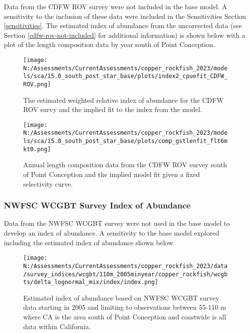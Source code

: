 \documentclass[11pt,
  english,
  letterpaper,
]{article}
\begin{document}
Data from the CDFW ROV survey were not included in the base model. A sensitivity to the inclusion of these data were included in the Sensitivities Section \ref{sensitivities}. The estimated index of abundance from the uncorrected data (see Section \ref{cdfw-rov-not-included} for additional information) is shown below with a plot of the length composition data by year south of Point Conception.

\begin{figure}
\centering
\texttt{[image: N:/Assessments/CurrentAssessments/copper\_rockfish\_2023/models/sca/15.0\_south\_post\_star\_base/plots/index2\_cpuefit\_CDFW\_ROV.png]}
\caption{The estimated weighted relative index of abundance for the CDFW ROV survy and the implied fit to the index from the model.\label{fig:rov-index}}
\end{figure}

\newpage

\begin{figure}
\centering
\texttt{[image: N:/Assessments/CurrentAssessments/copper\_rockfish\_2023/models/sca/15.0\_south\_post\_star\_base/plots/comp\_gstlenfit\_flt6mkt0.png]}
\caption{Annual length composition data from the CDFW ROV survey south of Point Conception and the implied model fit given a fixed selectivity curve.\label{fig:rov-len-data}}
\end{figure}

\pagebreak

\hypertarget{nwfsc-wcgbt-survey-index-of-abundance}{%
\subsubsection{NWFSC WCGBT Survey Index of Abundance}\label{nwfsc-wcgbt-survey-index-of-abundance}}

Data from the NWFSC WCGBT survey were not used in the base model to develop an index of abundance. A sensitivity to the base model explored including the estimated index of abundance shown below

\begin{figure}
\centering
\texttt{[image: N:/Assessments/CurrentAssessments/copper\_rockfish\_2023/data/survey\_indices/wcgbt/110m\_2005minyear/copper\_rockfish/wcgbts/delta\_lognormal\_mix/index/index.png]}
\caption{Estimated index of abundance based on NWFSC WCGBT survey data starting in 2005 and limiting to observations between 55-110 m where CA is the area south of Point Conception and coastwide is all data within California.\label{fig:wcgbt-index}}
\end{figure}
\end{document}
